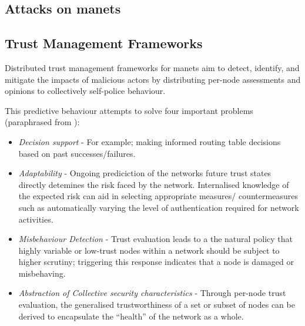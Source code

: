 \subsection{Attacks on \glspl{manet}}



\subsection{Trust Management Frameworks}\label{sec:c2_tmfs}

Distributed trust management frameworks for \gls{manet}s aim to detect, identify, and mitigate the impacts of malicious actors by distributing per-node assessments and opinions to collectively self-police behaviour.

This predictive behaviour attempts to solve four important problems (paraphrased from \cite{Sun2008}):
\begin{itemize}
  \item \emph{Decision support} - For example; making informed routing table decisions based on past successes/failures.
  \item \emph{Adaptability} - Ongoing prediciction of the networks future trust states directly detemines the risk faced by the network. Internalised knowledge of the expected risk can aid in selecting appropriate measures/ countermeasures such as automatically varying the level of authentication required for network activities.
  \item \emph{Misbehaviour Detection} - Trust evaluation leads to a the natural policy that highly variable or low-trust nodes within a network should be subject to higher scrutiny; triggering this response indicates that a node is damaged or misbehaving.
  \item \emph{Abstraction of Collective security characteristics} - Through per-node trust evaluation, the generalised trustworthiness of a set or subset of nodes can be derived to encapsulate the ``health'' of the network as a whole.
\end{itemize}


